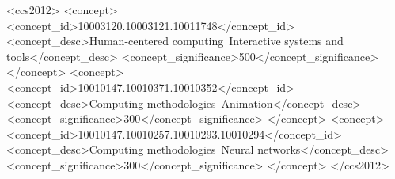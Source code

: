 \begin{CCSXML}
<ccs2012>
   <concept>
       <concept_id>10003120.10003121.10011748</concept_id>
       <concept_desc>Human-centered computing~Interactive systems and tools</concept_desc>
       <concept_significance>500</concept_significance>
   </concept>
   <concept>
       <concept_id>10010147.10010371.10010352</concept_id>
       <concept_desc>Computing methodologies~Animation</concept_desc>
       <concept_significance>300</concept_significance>
   </concept>
   <concept>
       <concept_id>10010147.10010257.10010293.10010294</concept_id>
       <concept_desc>Computing methodologies~Neural networks</concept_desc>
       <concept_significance>300</concept_significance>
   </concept>
</ccs2012>
\end{CCSXML}

